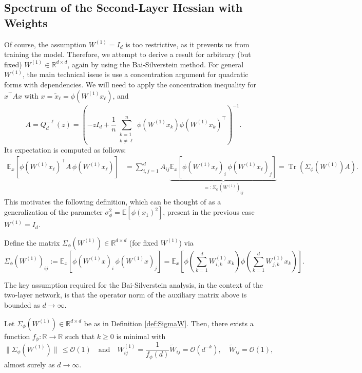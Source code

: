 \documentclass{article}
\begin{document}
\subsection{Spectrum of the Second-Layer Hessian with Weights}\label{sec:main-IIW}
Of course, the assumption $W^{(1)}=I_d$ is too restrictive, as it prevents us from training the model. Therefore, we attempt to derive a result for arbitrary (but fixed) $W^{(1)}\in\mathbb{R}^{d\times d}$, again by using the Bai-Silverstein method. For general $W^{(1)}$, the main technical issue is use a concentration argument for quadratic forms with dependencies. We will need to apply the concentration inequality for $x^\top A x$ with $x=\tilde{x}_\ell=\phi(W^{(1)}x_\ell)$, and
\begin{equation}
A=Q_d^{-\ell}(z)=\left(-zI_d + \frac{1}{n}\sum_{\substack{k=1 \\ k\neq\ell}}^n\phi(W^{(1)}x_k)\phi(W^{(1)}x_k)^\top\right)^{-1}.
\end{equation}
Its expectation is computed as follows:
\begin{align}
\mathbb{E}_{x}[\phi(W^{(1)}x_\ell)^\top A\, \phi(W^{(1)}x_\ell)] &= \sum_{i,j=1}^d A_{ij}\underbrace{\mathbb{E}_{x}[\phi(W^{(1)}x_\ell)_i\,\phi(W^{(1)}x_\ell)_j]}_{=:\Sigma_\phi(W^{(1)})_{ij}} = \operatorname{Tr}(\Sigma_\phi(W^{(1)})A).
\end{align}
This motivates the following definition, which can be thought of as a generalization of the parameter $\sigma_\phi^2=\mathbb{E}[\phi(x_1)^2]$, present in the previous case $W^{(1)}=I_d$.
\bigskip
\begin{definition} Define the matrix $\Sigma_\phi(W^{(1)})\in\mathbb{R}^{d\times d}$ (for fixed $W^{(1)}$) via
\begin{equation*}
\Sigma_\phi(W^{(1)})_{ij}:=\mathbb{E}_x\left[\phi(W^{(1)}x)_i\,\phi(W^{(1)}x)_j\right]=\mathbb{E}_x\left[\phi\left(\sum_{k=1}^dW^{(1)}_{i,k}x_k\right)\phi\left(\sum_{k=1}^dW^{(1)}_{j,k}x_k\right)\right].
\end{equation*} \label{def:SigmaW}
\end{definition}
\bigskip
\par
The key assumption required for the Bai-Silverstein analysis, in the context of the two-layer network, is that the operator norm of the auxiliary matrix above is bounded as $d\to\infty$.
\bigskip
\begin{assumption}
Let $\Sigma_\phi(W^{(1)})\in\mathbb{R}^{d\times d}$ be as in Definition \ref{def:SigmaW}. Then, there exists a function $f_\phi:\mathbb{R}\to\mathbb{R}$ such that $k\geq0$ is minimal with
$$\|\Sigma_\phi(W^{(1)})\|\,\leq\mathcal{O}(1) \quad\text{and}\quad W^{(1)}_{ij}=\frac{1}{f_\phi(d)}\tilde{W}_{ij}=\mathcal{O}(d^{-k}),\quad \tilde{W}_{ij}=\mathcal{O}(1),$$\label{ass:scaling-W}
almost surely as $d\to\infty$.
\end{assumption}
\end{document}
